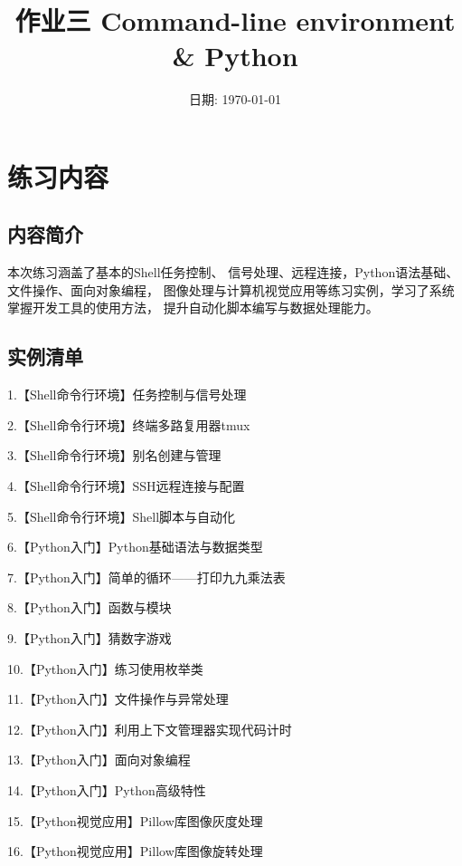 \documentclass[cn,12pt]{report}
\title{作业三 \quad Command-line environment‌ \& Python} %
\date{日期: \today} %
\institute{中国海洋大学·信息科学与工程学部·计算机学院} %
\begin{document}
\maketitle



\section{练习内容}
\subsection{内容简介}
  本次练习涵盖了基本的Shell任务控制、
  信号处理、远程连接，Python语法基础、文件操作、面向对象编程，
  图像处理与计算机视觉应用等练习实例，学习了系统掌握开发工具的使用方法，
  提升自动化脚本编写与数据处理能力。
\subsection{实例清单}
  1.【Shell命令行环境】任务控制与信号处理

  2.【Shell命令行环境】终端多路复用器tmux

  3.【Shell命令行环境】别名创建与管理

  4.【Shell命令行环境】SSH远程连接与配置

  5.【Shell命令行环境】Shell脚本与自动化

  6.【Python入门】Python基础语法与数据类型

  7.【Python入门】简单的循环——打印九九乘法表

  8.【Python入门】函数与模块

  9.【Python入门】猜数字游戏

  10.【Python入门】练习使用枚举类

  11.【Python入门】文件操作与异常处理

  12.【Python入门】利用上下文管理器实现代码计时

  13.【Python入门】面向对象编程

  14.【Python入门】Python高级特性

  15.【Python视觉应用】Pillow库图像灰度处理

  16.【Python视觉应用】Pillow库图像旋转处理
\end{document}
